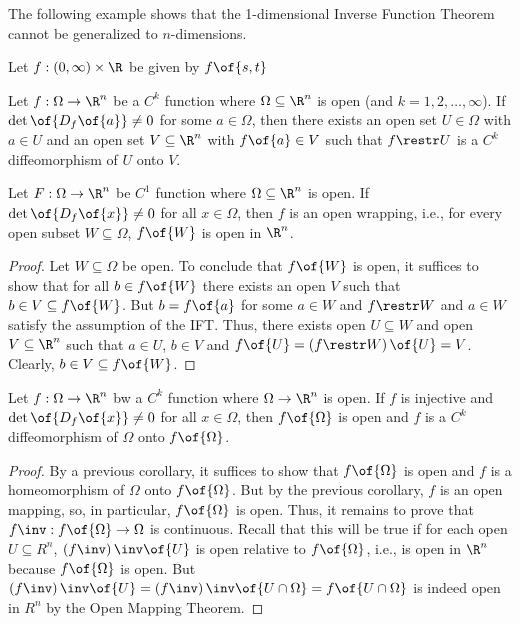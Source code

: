 \begin{remark}
    The following example shows that the 1-dimensional Inverse Function Theorem cannot be generalized to $n$-dimensions.
\end{remark}

\begin{example}
    Let $f: (0, \infty) \times \R$ be given by $f\of{s, t}$
\end{example}

\begin{theorem}
    Let $f: \Omega \to \R^n$ be a $C^k$ function where $\Omega \subseteq \R^n$ is open (and $k = 1, 2, \dots, \infty$). If $\det \of{D_f\of{a}} \neq 0$ for some $a \in \Omega$, then there exists an open set $U \in \Omega$ with $a \in U$ and an open set $V \subseteq \R^n$ with $f\of{a} \in V$ such that $f \restr U$ is a $C^k$ diffeomorphism of $U$ onto $V$.
\end{theorem}

\begin{corollary}
    Let $F: \Omega \to \R^n$ be $C^1$ function where $\Omega \subseteq \R^n$ is open. If $\det\of{D_f\of{x}} \neq 0$ for all $x \in \Omega$, then $f$ is an open wrapping, i.e., for every open subset $W \subseteq \Omega$, $f\of{W}$ is open in $\R^n$.
\end{corollary}
\begin{proof}
    Let $W \subseteq \Omega$ be open. To conclude that $f\of{W}$ is open, it suffices to show that for all $b \in f\of{W}$ there exists an open $V$ such that $b \in V \subseteq f\of{W}$. But $b = f\of{a}$ for some $a \in W$ and $f \restr W$ and $a \in W$ satisfy the assumption of the IFT. Thus, there exists open $U \subseteq W$ and open $V \subseteq \R^n$ such that $a \in U$, $b \in V$ and $f\of{U} = \left(f \restr W\right)\of{U} = V$. Clearly, $b \in V \subseteq f\of{W}$.
\end{proof}

\begin{corollary}
    Let $f: \Omega \to \R^n$ bw a $C^k$ function where $\Omega \to \R^n$ is open. If $f$ is injective and $\det\of{D_f\of{x}} \neq 0$ for all $x \in \Omega$, then $f\of{\Omega}$ is open and $f$ is a $C^k$ diffeomorphism of $\Omega$ onto $f\of{\Omega}$.
\end{corollary}
\begin{proof}
    By a previous corollary, it suffices to show that $f\of{\Omega}$ is open and $f$ is a homeomorphism of $\Omega$ onto $f\of{\Omega}$. But by the previous corollary, $f$ is an open mapping, so, in particular, $f\of{\Omega}$ is open. Thus, it remains to prove that $f\inv: f\of{\Omega} \to \Omega$ is continuous. Recall that this will be true if for each open $U \subseteq R^n$, $\left(f\inv\right)\inv\of{U}$ is open relative to $f\of{\Omega}$, i.e., is open in $\R^n$ because $f\of{\Omega}$ is open. But $\left(f\inv\right)\inv\of{U} = \left(f\inv\right)\inv\of{U \cap \Omega} = f\of{U \cap \Omega}$ is indeed open in $R^n$ by the Open Mapping Theorem.
\end{proof}


